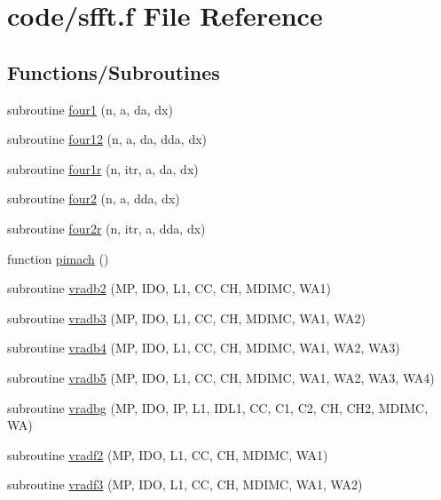 \hypertarget{sfft_8f}{}\section{code/sfft.f File Reference}
\label{sfft_8f}
\subsection*{Functions/\+Subroutines}
\begin{DoxyCompactItemize}
\item 
subroutine \hyperlink{sfft_8f_a3274082ab31b5f843d75b9e8e1e654e6}{four1} (n, a, da, dx)
\item 
subroutine \hyperlink{sfft_8f_ac1d50a4cb97554dc32c9c293a8ec3558}{four12} (n, a, da, dda, dx)
\item 
subroutine \hyperlink{sfft_8f_a5f93a60e103ea341eb2a9178a4914bf5}{four1r} (n, itr, a, da, dx)
\item 
subroutine \hyperlink{sfft_8f_adf0e24e539f85736a86372829a8cb19e}{four2} (n, a, dda, dx)
\item 
subroutine \hyperlink{sfft_8f_aaaebfce61bc0b8ffaddcadfb2d679458}{four2r} (n, itr, a, dda, dx)
\item 
function \hyperlink{sfft_8f_ad86cceddf7c0c034a76379b21163024e}{pimach} ()
\item 
subroutine \hyperlink{sfft_8f_a50cb81e98209534944c5c916df2eea93}{vradb2} (MP, I\+DO, L1, CC, CH, M\+D\+I\+MC, W\+A1)
\item 
subroutine \hyperlink{sfft_8f_a369ffff45441a6f6cee162a47056786f}{vradb3} (MP, I\+DO, L1, CC, CH, M\+D\+I\+MC, W\+A1, W\+A2)
\item 
subroutine \hyperlink{sfft_8f_a19331a52326efa3912dfc83154027fdb}{vradb4} (MP, I\+DO, L1, CC, CH, M\+D\+I\+MC, W\+A1, W\+A2, W\+A3)
\item 
subroutine \hyperlink{sfft_8f_a28be0d946044b62f3b112bc9189d39c4}{vradb5} (MP, I\+DO, L1, CC, CH, M\+D\+I\+MC, W\+A1, W\+A2, W\+A3, W\+A4)
\item 
subroutine \hyperlink{sfft_8f_aacbf9c8d49a2bab31f765ae928ddd167}{vradbg} (MP, I\+DO, IP, L1, I\+D\+L1, CC, C1, C2, CH, C\+H2, M\+D\+I\+MC, WA)
\item 
subroutine \hyperlink{sfft_8f_a69a51bb30027a4f9516a780a1c8a01be}{vradf2} (MP, I\+DO, L1, CC, CH, M\+D\+I\+MC, W\+A1)
\item 
subroutine \hyperlink{sfft_8f_a65e357e8ef1818d89c8a5fc8f9f680ac}{vradf3} (MP, I\+DO, L1, CC, CH, M\+D\+I\+MC, W\+A1, W\+A2)
\item 

\end{DoxyCompactItemize}

